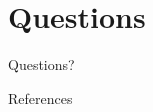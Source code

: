 \documentclass{beamer}
\begin{document}
\section*{Questions}
\begin{frame}
Questions?
\end{frame}

\begin{frame}{References}%


\end{frame}


%
%
%
%
%
%
%
%
%
\end{document}
